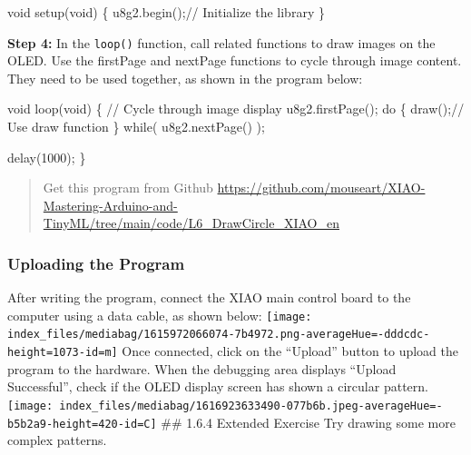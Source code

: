\documentclass[
  letterpaper,
  DIV=11,
  numbers=noendperiod]{scrreprt}
\newenvironment{Shaded}{\begin{snugshade}}{\end{snugshade}}
\newcommand{\CommentTok}[1]{\textcolor[rgb]{0.37,0.37,0.37}{#1}}
\newcommand{\ControlFlowTok}[1]{\textcolor[rgb]{0.00,0.23,0.31}{#1}}
\newcommand{\DataTypeTok}[1]{\textcolor[rgb]{0.68,0.00,0.00}{#1}}
\newcommand{\DecValTok}[1]{\textcolor[rgb]{0.68,0.00,0.00}{#1}}
\newcommand{\NormalTok}[1]{\textcolor[rgb]{0.00,0.23,0.31}{#1}}
\newcommand{\OperatorTok}[1]{\textcolor[rgb]{0.37,0.37,0.37}{#1}}
\begin{document}
\begin{Shaded}
\begin{Highlighting}[]
\DataTypeTok{void}\NormalTok{ setup}\OperatorTok{(}\DataTypeTok{void}\OperatorTok{)} \OperatorTok{\{}
\NormalTok{    u8g2}\OperatorTok{.}\NormalTok{begin}\OperatorTok{();}\CommentTok{// Initialize the library}
\OperatorTok{\}}
\end{Highlighting}
\end{Shaded}

\textbf{Step 4:} In the \texttt{loop()} function, call related functions
to draw images on the OLED. Use the firstPage and nextPage functions to
cycle through image content. They need to be used together, as shown in
the program below:

\begin{Shaded}
\begin{Highlighting}[]
\DataTypeTok{void}\NormalTok{ loop}\OperatorTok{(}\DataTypeTok{void}\OperatorTok{)} \OperatorTok{\{}
    \CommentTok{// Cycle through image display}
\NormalTok{    u8g2}\OperatorTok{.}\NormalTok{firstPage}\OperatorTok{();}
    \ControlFlowTok{do} \OperatorTok{\{}
\NormalTok{        draw}\OperatorTok{();}\CommentTok{// Use draw function}
    \OperatorTok{\}} \ControlFlowTok{while}\OperatorTok{(}\NormalTok{ u8g2}\OperatorTok{.}\NormalTok{nextPage}\OperatorTok{()} \OperatorTok{);}

\NormalTok{    delay}\OperatorTok{(}\DecValTok{1000}\OperatorTok{);}
\OperatorTok{\}}
\end{Highlighting}
\end{Shaded}

\begin{quote}
Get this program from Github
\url{https://github.com/mouseart/XIAO-Mastering-Arduino-and-TinyML/tree/main/code/L6_DrawCircle_XIAO_en}
\end{quote}

\hypertarget{uploading-the-program-4}{%
\subsubsection*{Uploading the Program}\label{uploading-the-program-4}}

After writing the program, connect the XIAO main control board to the
computer using a data cable, as shown below:
\texttt{[image: index\_files/mediabag/1615972066074-7b4972.png-averageHue=-dddcdc-height=1073-id=m]}
Once connected, click on the ``Upload'' button to upload the program to
the hardware. When the debugging area displays ``Upload Successful'',
check if the OLED display screen has shown a circular pattern.
\texttt{[image: index\_files/mediabag/1616923633490-077b6b.jpeg-averageHue=-b5b2a9-height=420-id=C]}
\#\# 1.6.4 Extended Exercise Try drawing some more complex patterns.
\end{document}
